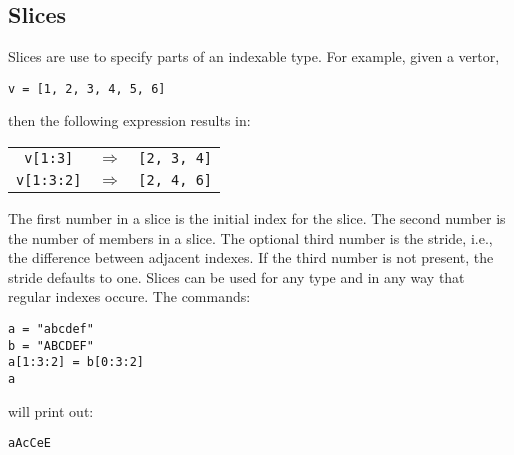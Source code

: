 \documentclass{article}
\begin{document}
\subsection{Slices}
Slices are use to specify parts of an indexable type.
For example, given a vertor,
\begin{center}
\verb|v = [1, 2, 3, 4, 5, 6]|
\end{center}
then the following expression results in:
\begin{center}
\begin{tabular}{ccc}
  \verb|v[1:3]| & $\Rightarrow$ & \verb|[2, 3, 4]| \\
  \verb|v[1:3:2]| & $\Rightarrow$ & \verb|[2, 4, 6]| \\
\end{tabular}
\end{center}
The first number in a slice is the initial index for the slice.
The second number is the number of members in a slice.
The optional third number is the stride, i.e., the difference between
adjacent indexes.
If the third number is not present, the stride defaults
to one.
Slices can be used for any type and in any way that regular indexes occure.
The commands:
\begin{verbatim}
a = "abcdef"
b = "ABCDEF"
a[1:3:2] = b[0:3:2]
a
\end{verbatim}
will print out:
\begin{verbatim}
aAcCeE
\end{verbatim}
\end{document}
